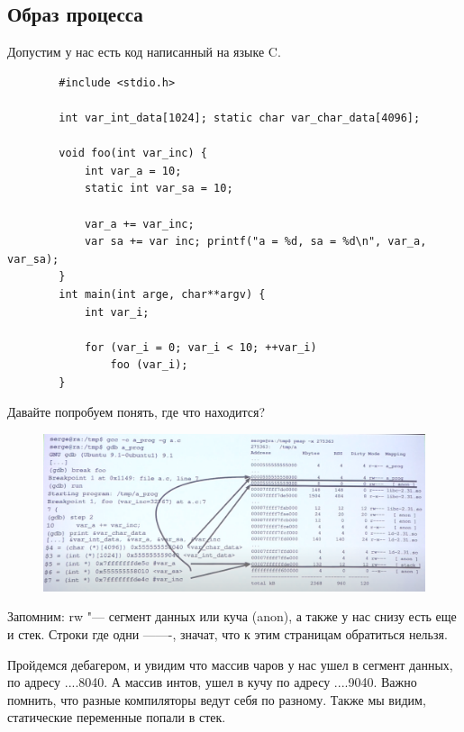 \documentclass[bachelor, och, book]{SCWorks}
\theoremstyle{remark}
\begin{document}
    \subsection{Образ процесса}

    Допустим у нас есть код написанный на языке C.

    \begin{verbatim}
        #include <stdio.h>

        int var_int_data[1024]; static char var_char_data[4096];
        
        void foo(int var_inc) {
            int var_a = 10;
            static int var_sa = 10;
            
            var_a += var_inc;
            var sa += var inc; printf("a = %d, sa = %d\n", var_a, var_sa);
        }
        int main(int arge, char**argv) { 
            int var_i;
            
            for (var_i = 0; var_i < 10; ++var_i) 
                foo (var_i);
        }
    \end{verbatim}

    Давайте попробуем понять, где что находится?
    
    \begin{figure}[H]
        \begin{center}
            \includegraphics[scale=0.5]{res/example-C-programm-for-process.png}
            \caption{}
        \end{center}
    \end{figure}

    Запомним: rw "--- сегмент данных или куча (anon), а также у нас снизу есть еще и стек. Строки где одни -------, значат, что к этим страницам обратиться нельзя.

    Пройдемся дебагером, и увидим что массив чаров у нас ушел в сегмент данных, по адресу ....8040. А массив интов, ушел в кучу по адресу ....9040. Важно помнить, что разные компиляторы ведут себя по разному. Также мы видим, статические переменные попали в стек. 
    
\end{document}
